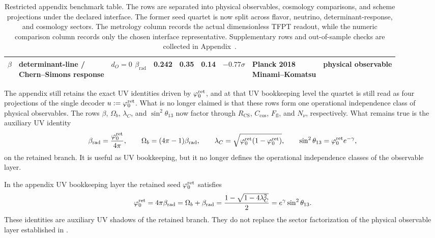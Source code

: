 \begin{table}[t]
{\begin{tabular}{@{}lllrrrrll@{}}
$\beta$ & \makecell[l]{determinant-line /\\Chern--Simons response} & \makecell[l]{$d_O=0$\\$\beta_{\mathrm{rad}}$} & \num{0.242} & \num{0.35} & \num{0.14} & $-0.77\sigma$ & \makecell[l]{Planck 2018\\Minami--Komatsu} & physical observable \\
\bottomrule
\end{tabular}}
\caption{Restricted appendix benchmark table. The rows are separated into physical observables,
cosmology comparisons, and scheme projections under the declared interface. The former seed quartet
is now split across flavor, neutrino, determinant-response, and cosmology sectors. The metrology
column records the actual dimensionless TFPT readout, while the numeric comparison column records
only the chosen interface representative. Supplementary rows and out-of-sample checks are collected
in Appendix~.}
\label{tab:benchmark}
\end{table}

\begin{remark}
The appendix still retains the exact UV identities driven by $\varphi_0^{\mathrm{ret}}$, and at that UV bookkeeping
level the quartet is still read as four projections of the single decoder $u:=\varphi_0^{\mathrm{ret}}$. What is no
longer claimed is that these rows form one operational independence class of physical observables.
The rows $\beta$, $\Omega_b$, $\lambda_C$, and $\sin^2\theta_{13}$ now factor through
$R_{\mathrm{CS}}$, $C_{\mathrm{cos}}$, $F_{\mathrm{fl}}$, and $N_\nu$, respectively. What remains
true is the auxiliary UV identity
\[
\beta_{\mathrm{rad}}=\frac{\varphi_0^{\mathrm{ret}}}{4\pi},
\qquad
\Omega_b=(4\pi-1)\beta_{\mathrm{rad}},
\qquad
\lambda_C=\sqrt{\varphi_0^{\mathrm{ret}}(1-\varphi_0^{\mathrm{ret}})},
\qquad
\sin^2\theta_{13}=\varphi_0^{\mathrm{ret}} e^{-\gamma},
\]
on the retained branch. It is useful as UV bookkeeping, but it no longer defines the operational
independence classes of the observable layer.
\end{remark}

\begin{corollary}
\label{cor:retained-seed-factorization}
In the appendix UV bookkeeping layer the retained seed $\varphi_0^{\mathrm{ret}}$ satisfies
\[
\varphi_0^{\mathrm{ret}}
=
4\pi\beta_{\mathrm{rad}}
=
\Omega_b+\beta_{\mathrm{rad}}
=
\frac{1-\sqrt{1-4\lambda_C^2}}{2}
=
e^{\gamma}\sin^2\theta_{13}.
\]
These identities are auxiliary UV shadows of the retained branch. They do not replace the sector
factorization of the physical observable layer established in
.
\end{corollary}

